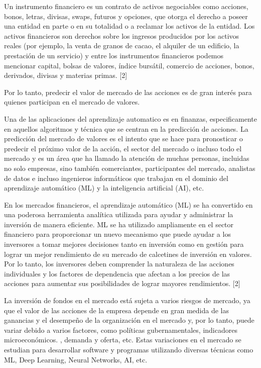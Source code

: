 \documentclass[a4paper]{article}
\begin{document}
Un instrumento financiero es un contrato de activos negociables como acciones, bonos, letras, divisas, swaps, futuros y opciones, que otorga el derecho a poseer una entidad en parte o en su totalidad o a reclamar los activos de la entidad. Los activos financieros son derechos sobre los ingresos producidos por los activos reales (por ejemplo, la venta de granos de cacao, el alquiler de un edificio, la prestación de un servicio) y entre los instrumentos financieros podemos mencionar capital, bolsas de valores, índice bursátil, comercio de acciones, bonos, derivados, divisas y materias primas. [2] 

Por lo tanto, predecir el valor de mercado de las acciones es de gran interés para quienes participan en el mercado de valores. 

Una de las aplicaciones del aprendizaje automatico es en finanzas, especificamente en aquellos  algoritmos y técnica que se centran en la predicción de acciones. La predicción del mercado de valores es el intento que se hace para pronosticar o predecir el próximo valor de la acción, el sector del mercado o incluso todo el mercado y es un área que ha llamado la atención de muchas personas, incluidas no solo empresas, sino también comerciantes, participantes del mercado, analistas de datos e incluso ingenieros informáticos que trabajan en el dominio del aprendizaje automático (ML) y la inteligencia artificial (AI), etc.  

En los mercados financieros, el aprendizaje automático (ML) se ha convertido en una poderosa herramienta analítica utilizada para ayudar y administrar la inversión de manera eficiente. ML se ha utilizado ampliamente en el sector financiero para proporcionar un nuevo mecanismo que puede ayudar a los inversores a tomar mejores decisiones tanto en inversión como en gestión para lograr un mejor rendimiento de su mercado de calcetines de inversión en valores. Por lo tanto, los inversores deben comprender la naturaleza de las acciones individuales y los factores de dependencia que afectan a los precios de las acciones para aumentar sus posibilidades de lograr mayores rendimientos. [2]  

La inversión de fondos en el mercado está sujeta a varios riesgos de mercado, ya que el valor de las acciones de la empresa depende en gran medida de las ganancias y el desempeño de la organización en el mercado y, por lo tanto, puede variar debido a varios factores, como políticas gubernamentales, indicadores microeconómicos. , demanda y oferta, etc. Estas variaciones en el mercado se estudian para desarrollar software y programas utilizando diversas técnicas como ML, Deep Learning, Neural Networks, AI, etc. 
\end{document}
